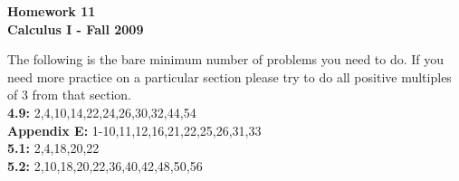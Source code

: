 \documentclass[12pt]{article}
\begin{document}
\begin{center}
{\large \bf Homework 11}\\
\bf{Calculus I - Fall 2009}
\end{center}

The following is the bare minimum number of problems you need to do.  If you need more practice on a particular section please try to do all positive multiples of 3 from that section.\\

{\bf 4.9:}  2,4,10,14,22,24,26,30,32,44,54\\

{\bf Appendix E:} 1-10,11,12,16,21,22,25,26,31,33\\

{\bf 5.1:}  2,4,18,20,22\\

{\bf 5.2:}  2,10,18,20,22,36,40,42,48,50,56\\

\vspace{.5 in.}
\end{document}

